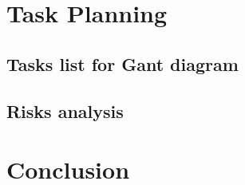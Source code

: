 \documentclass[12pt]{article}
\begin{document}
\section{Task Planning}					\label{sec:generalArchitecture} 		
	\subsection{Tasks list for Gant diagram}			\label{sec:Gantt}	%
	\subsection{Risks analysis}		\label{sec:Risks}		%
\newpage



\section{Conclusion}						\label{sec:conclusion}	%
\newpage

%
%
\end{document}
